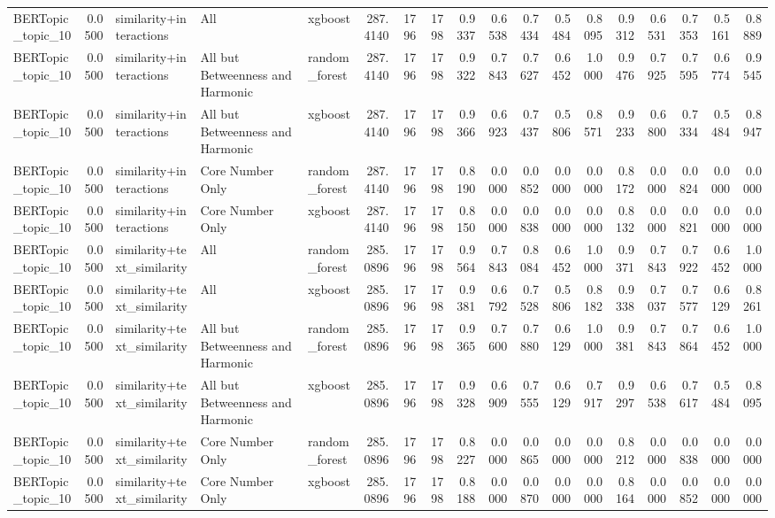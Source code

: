 \begin{tabular}{lrlllrrrrrrrrrrrrr}
BERTopic_topic_10 & 0.0500 & similarity+interactions & All & xgboost & 287.4140 & 1796 & 1798 & 0.9337 & 0.6538 & 0.7434 & 0.5484 & 0.8095 & 0.9312 & 0.6531 & 0.7353 & 0.5161 & 0.8889 \\
BERTopic_topic_10 & 0.0500 & similarity+interactions & All but Betweenness and Harmonic & random_forest & 287.4140 & 1796 & 1798 & 0.9322 & 0.7843 & 0.7627 & 0.6452 & 1.0000 & 0.9476 & 0.7925 & 0.7595 & 0.6774 & 0.9545 \\
BERTopic_topic_10 & 0.0500 & similarity+interactions & All but Betweenness and Harmonic & xgboost & 287.4140 & 1796 & 1798 & 0.9366 & 0.6923 & 0.7437 & 0.5806 & 0.8571 & 0.9233 & 0.6800 & 0.7334 & 0.5484 & 0.8947 \\
BERTopic_topic_10 & 0.0500 & similarity+interactions & Core Number Only & random_forest & 287.4140 & 1796 & 1798 & 0.8190 & 0.0000 & 0.0852 & 0.0000 & 0.0000 & 0.8172 & 0.0000 & 0.0824 & 0.0000 & 0.0000 \\
BERTopic_topic_10 & 0.0500 & similarity+interactions & Core Number Only & xgboost & 287.4140 & 1796 & 1798 & 0.8150 & 0.0000 & 0.0838 & 0.0000 & 0.0000 & 0.8132 & 0.0000 & 0.0821 & 0.0000 & 0.0000 \\
BERTopic_topic_10 & 0.0500 & similarity+text_similarity & All & random_forest & 285.0896 & 1796 & 1798 & 0.9564 & 0.7843 & 0.8084 & 0.6452 & 1.0000 & 0.9371 & 0.7843 & 0.7922 & 0.6452 & 1.0000 \\
BERTopic_topic_10 & 0.0500 & similarity+text_similarity & All & xgboost & 285.0896 & 1796 & 1798 & 0.9381 & 0.6792 & 0.7528 & 0.5806 & 0.8182 & 0.9338 & 0.7037 & 0.7577 & 0.6129 & 0.8261 \\
BERTopic_topic_10 & 0.0500 & similarity+text_similarity & All but Betweenness and Harmonic & random_forest & 285.0896 & 1796 & 1798 & 0.9365 & 0.7600 & 0.7880 & 0.6129 & 1.0000 & 0.9381 & 0.7843 & 0.7864 & 0.6452 & 1.0000 \\
BERTopic_topic_10 & 0.0500 & similarity+text_similarity & All but Betweenness and Harmonic & xgboost & 285.0896 & 1796 & 1798 & 0.9328 & 0.6909 & 0.7555 & 0.6129 & 0.7917 & 0.9297 & 0.6538 & 0.7617 & 0.5484 & 0.8095 \\
BERTopic_topic_10 & 0.0500 & similarity+text_similarity & Core Number Only & random_forest & 285.0896 & 1796 & 1798 & 0.8227 & 0.0000 & 0.0865 & 0.0000 & 0.0000 & 0.8212 & 0.0000 & 0.0838 & 0.0000 & 0.0000 \\
BERTopic_topic_10 & 0.0500 & similarity+text_similarity & Core Number Only & xgboost & 285.0896 & 1796 & 1798 & 0.8188 & 0.0000 & 0.0870 & 0.0000 & 0.0000 & 0.8164 & 0.0000 & 0.0852 & 0.0000 & 0.0000 \\

\end{tabular}
